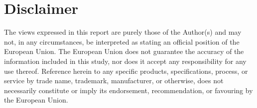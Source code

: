 \section*{Disclaimer}
The views expressed in this report are purely those of the Author(s) and may not, in any circumstances, be interpreted as stating an official position of the European Union. The European Union does not guarantee the accuracy of the information included in this study, nor does it accept any responsibility for any use thereof. Reference herein to any specific products, specifications, process, or service by trade name, trademark, manufacturer, or otherwise, does not necessarily constitute or imply its endorsement, recommendation, or favouring by the European Union. 
